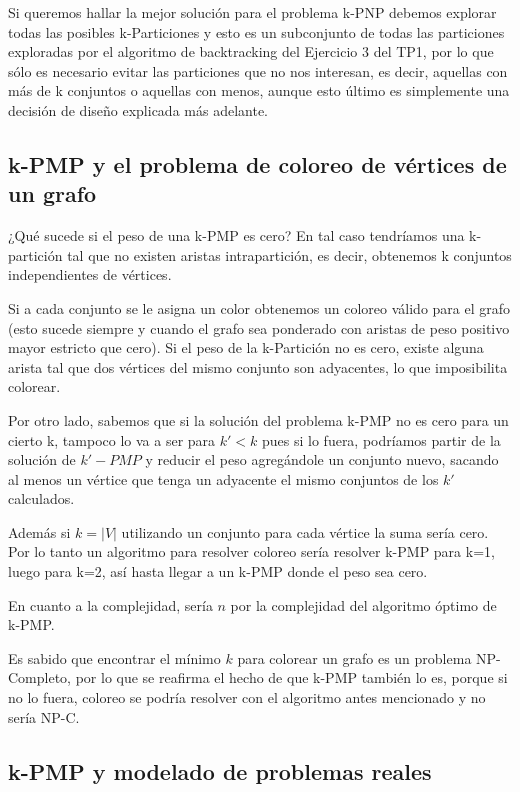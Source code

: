 Si queremos hallar la mejor soluci\'on para el problema k-PNP debemos explorar todas las posibles k-Particiones y esto es un subconjunto de todas las particiones exploradas por el algoritmo de backtracking del Ejercicio 3 del TP1, por lo que s\'olo es necesario evitar las particiones que no nos interesan, es decir, aquellas con m\'as de k conjuntos o aquellas con menos, aunque esto \'ultimo es simplemente una decisi\'on de dise\~no explicada m\'as adelante.

\subsection{k-PMP y el problema de coloreo de v\'ertices de un grafo}

¿Qu\'e sucede si el peso de una k-PMP es cero? En tal caso tendr\'iamos una k-partici\'on tal que no existen aristas intrapartici\'on, es decir, obtenemos k conjuntos independientes de v\'ertices.

Si a cada conjunto se le asigna un color obtenemos un coloreo v\'alido para el grafo (esto sucede siempre y cuando el grafo sea ponderado con aristas de peso positivo mayor estricto que cero). Si el peso de la k-Partici\'on no es cero, existe alguna arista tal que dos v\'ertices del mismo conjunto son adyacentes, lo que imposibilita colorear. 

Por otro lado, sabemos que si la soluci\'on del problema k-PMP no es cero para un cierto k, tampoco lo va a ser para $k' < k$ pues si lo fuera, podr\'iamos partir de la soluci\'on de $k'-PMP$ y reducir el peso agreg\'andole un conjunto nuevo, sacando al menos un v\'ertice que tenga un adyacente el mismo conjuntos de los $k'$ calculados. 

Adem\'as si $k = |V|$ utilizando un conjunto para cada v\'ertice la suma ser\'ia cero. Por lo tanto un algoritmo para resolver coloreo ser\'ia resolver k-PMP para k=1, luego para k=2, as\'i hasta llegar a un k-PMP donde el peso sea cero. 

En cuanto a la complejidad, ser\'ia $n$ por la complejidad del algoritmo \'optimo de k-PMP.

Es sabido que encontrar el m\'inimo $k$ para colorear un grafo es un problema NP-Completo, por lo que se reafirma el hecho de que k-PMP tambi\'en lo es, porque si no lo fuera, coloreo se podr\'ia resolver con el algoritmo antes mencionado y no ser\'ia NP-C.

\subsection{k-PMP y modelado de problemas reales}

